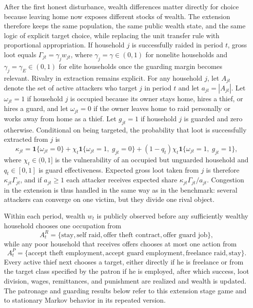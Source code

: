 After the first honest disturbance, wealth differences matter directly for choice because leaving home now exposes different stocks of wealth. The extension therefore keeps the same population, the same public wealth state, and the same logic of explicit target choice, while replacing the unit transfer rule with proportional appropriation. If household $j$ is successfully raided in period $t$, gross loot equals $\Gamma_{jt} = \gamma_j w_{jt}$, where $\gamma_j = \gamma \in (0,1)$ for nonelite households and $\gamma_j = \gamma_E \in (0,1)$ for elite households once the guarding margin becomes relevant. Rivalry in extraction remains explicit. For any household $j$, let $A_{jt}$ denote the set of active attackers who target $j$ in period $t$ and let $a_{jt} = |A_{jt}|$. Let $\omega_{jt}=1$ if household $j$ is occupied because its owner stays home, hires a thief, or hires a guard, and let $\omega_{jt}=0$ if the owner leaves home to raid personally or works away from home as a thief. Let $g_{jt}=1$ if household $j$ is guarded and zero otherwise. Conditional on being targeted, the probability that loot is successfully extracted from $j$ is
\begin{equation}
\kappa_{jt}
=
\mathbf{1}\{\omega_{jt}=0\}
+
\chi_t \mathbf{1}\{\omega_{jt}=1,\; g_{jt}=0\}
+
(1-q_t)\chi_t \mathbf{1}\{\omega_{jt}=1,\; g_{jt}=1\},
\label{eq:success-probability}
\end{equation}
where $\chi_t \in (0,1]$ is the vulnerability of an occupied but unguarded household and $q_t \in [0,1]$ is guard effectiveness. Expected gross loot taken from $j$ is therefore $\kappa_{jt}\Gamma_{jt}$, and if $a_{jt}\ge 1$ each attacker receives expected share $\kappa_{jt}\Gamma_{jt}/a_{jt}$. Congestion in the extension is thus handled in the same way as in the benchmark: several attackers can converge on one victim, but they divide one rival object.

Within each period, wealth $w_t$ is publicly observed before any sufficiently wealthy household chooses one occupation from
\[
A^{R}_t
=
\{\text{stay},\text{self raid},\text{offer theft contract},\text{offer guard job}\},
\]
while any poor household that receives offers chooses at most one action from
\[
A^{P}_t
=
\{\text{accept theft employment}, \text{accept guard employment}, \text{freelance raid}, \text{stay}\}.
\]
Every active thief next chooses a target, either directly if he is freelance or from the target class specified by the patron if he is employed, after which success, loot division, wages, remittances, and punishment are realized and wealth is updated. The patronage and guarding results below refer to this extension stage game and to stationary Markov behavior in its repeated version.

